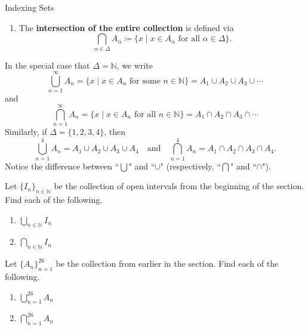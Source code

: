 \begin{section}{Indexing Sets}
\begin{definition}
\begin{enumerate}[label=\textrm{(\alph*)}]
\item The \textbf{intersection of the entire collection} is defined via
\[
\boxed{\bigcap_{\alpha\in\Delta} A_{\alpha}\coloneqq \{x\mid x\in A_{\alpha} \mbox{ for all }\alpha\in \Delta\}}.
\]
\end{enumerate}
\end{definition}

In the special case that $\Delta=\mathbb{N}$, we write
\[
\bigcup_{n=1}^{\infty}A_n= \{ x \mid  x \in A_n \mbox{ for some } n \in \mathbb{N}\}= A_1\cup A_2 \cup A_3 \cup \cdots
\] 
and
\[
\bigcap_{n=1}^{\infty}A_n= \{ x \mid  x \in A_n \mbox{ for all } n \in \mathbb{N}\} = A_1\cap A_2 \cap A_3 \cap \cdots
\] 
Similarly, if $\Delta=\{1,2,3,4\}$, then
\[
\bigcup_{n=1}^{4}A_n= A_1\cup A_2 \cup A_3 \cup A_4 \quad \text{and} \quad
\bigcap_{n=1}^{4}A_n= A_1\cap A_2 \cap A_3 \cap A_4.
\] 
Notice the difference between ``$\bigcup$" and ``$\cup$" (respectively, ``$\bigcap$" and ``$\cap$").  %

\begin{problem}
Let $\{I_n\}_{n\in\mathbb{N}}$ be the collection of open intervals from the beginning of the section.  Find each of the following.
\begin{multicols}{2}
\begin{enumerate}[label=\textrm{(\alph*)}]
\item $\displaystyle \bigcup_{n\in\mathbb{N}}I_n$
\item $\displaystyle \bigcap_{n\in\mathbb{N}}I_n$
\end{enumerate}
\end{multicols}
\end{problem}


\begin{problem}
Let $\{A_n\}_{n=1}^{26}$ be the collection from earlier in the section.  Find each of the following.
\begin{multicols}{2}
\begin{enumerate}[label=\textrm{(\alph*)}]
\item $\displaystyle \bigcup_{n=1}^{26}A_n$
\item $\displaystyle \bigcap_{n=1}^{26}A_n$
\end{enumerate}
\end{multicols}
\end{problem}


\end{section}

